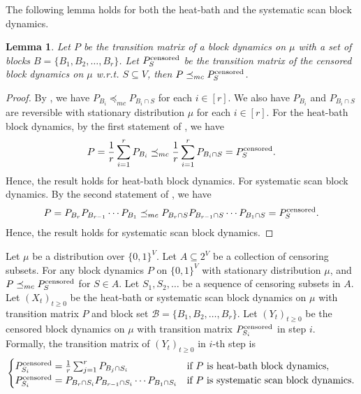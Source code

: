 \documentclass[11pt]{amsart}
\def\+#1{\mathcal{#1}}
\newtheorem{lemma}[theorem]{Lemma}
\theoremstyle{definition}
\theoremstyle{remark}
\begin{document}
The following lemma holds for both the heat-bath and the systematic scan block dynamics.

\begin{lemma}\label{lemma:monotone-censoring}
Let $P$ be the transition matrix of a block dynamics on $\mu$ with a set of blocks $B = \{B_1, B_2, \ldots, B_r\}$. Let $P_S^{\textnormal{censored}}$ be the transition matrix of the censored block dynamics on $\mu$ w.r.t. $S\subseteq V$, then $P\preceq_{mc} P_S^{\textnormal{censored}}$.
\end{lemma}

\begin{proof}
By , we have $P_{B_i}\preceq_{mc} P_{B_i\cap S}$ for each $i\in [r]$. 
We also have $P_{B_i}$ and $P_{B_i\cap S}$ are reversible with stationary distribution $\mu$ for each $i\in [r]$. For the heat-bath block dynamics, by the first statement of , we have 
$$P = \frac{1}{r}\sum_{i=1}^r P_{B_i} \preceq_{mc} \frac{1}{r}\sum_{i=1}^r P_{B_i\cap S} = P_S^{\textnormal{censored}}.$$
 Hence, the result holds for heat-bath block dynamics.
For systematic scan block dynamics. By the second statement of , we have 
\begin{align*}
    P = P_{B_r}P_{B_{r-1}}\cdots P_{B_1} \preceq_{mc} P_{B_r\cap S}P_{B_{r-1}\cap S}\cdots P_{B_1\cap S} = P_S^{\textnormal{censored}}. 
\end{align*}
Hence, the result holds for systematic scan block dynamics.
\end{proof}

Let $\mu$ be a distribution over $\{0,1\}^V$.
Let $A \subseteq 2^V$ be a collection of censoring subsets.
For any block dynamics $P$ on $\{0,1\}^V$ with stationary distribution $\mu$, and $P\preceq_{mc} P_S^{\textnormal{censored}}$ for $S\in A$.
Let $S_1, S_2, \ldots$ be a sequence of censoring subsets in $A$.
Let $(X_t)_{t\geq 0}$ be the heat-bath or systematic scan block dynamics on $\mu$ with transition matrix $P$ and block set $\+B =\{B_1, B_2, \ldots, B_r\}$.
Let $(Y_t)_{t\geq 0}$ be the censored block dynamics on $\mu$ with transition matrix $P_{S_i}^{\textnormal{censored}}$ in step $i$.
Formally, the transition matrix of $(Y_t)_{t\geq 0}$ in $i$-th step is
\begin{align*}
\begin{cases}
P_{S_i}^{\textnormal{censored}} = \frac{1}{r}\sum_{j=1}^r P_{B_j\cap S_i} & \text{if $P$ is heat-bath block dynamics}, \\
P_{S_i}^{\textnormal{censored}} = P_{B_r\cap S_i}P_{B_{r-1}\cap S_i}\cdots P_{B_1\cap S_i} & \text{if $P$ is systematic scan block dynamics}.
\end{cases}
\end{align*}
\end{document}
